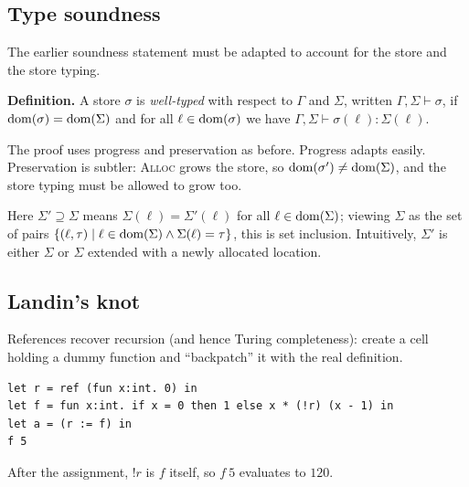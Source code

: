 \subsection*{Type soundness}

The earlier soundness statement must be adapted to account for the store and the
store typing.

\medskip
\noindent\textbf{Definition.} A store $\sigma$ is \emph{well-typed} with respect to
$\Gamma$ and $\Sigma$, written $\Gamma, \Sigma \vdash \sigma$, if
$\operatorname{dom}(\sigma) = \operatorname{dom}(\Sigma)$ and for all $\ell \in \operatorname{dom}(\sigma)$ we have
$\Gamma, \Sigma \vdash \sigma(\ell) : \Sigma(\ell)$.


The proof uses progress and preservation as before. Progress adapts easily.
Preservation is subtler: \textsc{Alloc} grows the store, so $\operatorname{dom}(\sigma') \neq
\operatorname{dom}(\Sigma)$, and the store typing must be allowed to grow too.


Here $\Sigma' \supseteq \Sigma$ means $\Sigma(\ell) = \Sigma'(\ell)$ for all
$\ell \in \operatorname{dom}(\Sigma)$; viewing $\Sigma$ as the set of pairs
$\{(\ell, \tau) \mid \ell \in \operatorname{dom}(\Sigma) \wedge \Sigma(\ell) = \tau\}$, this is
set inclusion. Intuitively, $\Sigma'$ is either $\Sigma$ or $\Sigma$ extended with
a newly allocated location.

\subsection*{Landin's knot}

References recover recursion (and hence Turing completeness): create a cell
holding a dummy function and ``backpatch'' it with the real definition.
\begin{verbatim}
let r = ref (fun x:int. 0) in
let f = fun x:int. if x = 0 then 1 else x * (!r) (x - 1) in
let a = (r := f) in
f 5
\end{verbatim}
After the assignment, $!r$ is $f$ itself, so $f\ 5$ evaluates to $120$.

